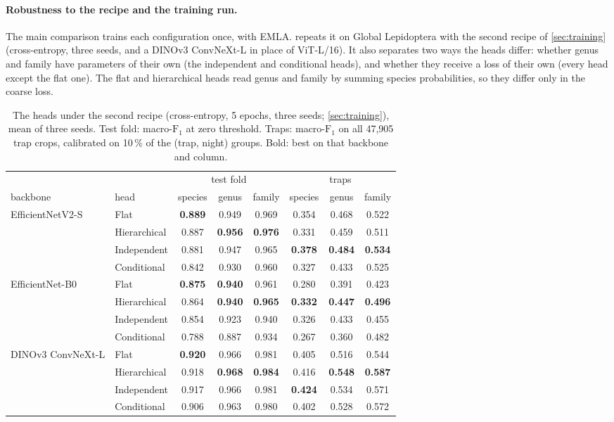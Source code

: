 \paragraph{Robustness to the recipe and the training run.}
The main comparison trains each configuration once, with EMLA.
 repeats it on Global Lepidoptera with the second recipe of \cref{sec:training} (cross-entropy, three seeds, and a DINOv3 ConvNeXt-L in place of ViT-L/16).
It also separates two ways the heads differ: whether genus and family have parameters of their own (the independent and conditional heads), and whether they receive a loss of their own (every head except the flat one).
The flat and hierarchical heads read genus and family by summing species probabilities, so they differ only in the coarse loss.

\begin{table}[htb]
    \centering
    \caption{The heads under the second recipe (cross-entropy, 5 epochs, three seeds; \cref{sec:training}), mean of three seeds. Test fold: macro-$\text{F}_1$ at zero threshold. Traps: macro-$\text{F}_1$ on all 47,905 trap crops, calibrated on 10\,\% of the (trap, night) groups. Bold: best on that backbone and column.}
    \label{tab:heads_ranks}
    \begin{tabular}{llcccccc}
        \toprule
        & & \multicolumn{3}{c}{test fold} & \multicolumn{3}{c}{traps} \\
        backbone & head & species & genus & family & species & genus & family \\
        \midrule
        EfficientNetV2-S & Flat & \textbf{0.889} & 0.949 & 0.969 & 0.354 & 0.468 & 0.522 \\
        & Hierarchical & 0.887 & \textbf{0.956} & \textbf{0.976} & 0.331 & 0.459 & 0.511 \\
        & Independent & 0.881 & 0.947 & 0.965 & \textbf{0.378} & \textbf{0.484} & \textbf{0.534} \\
        & Conditional & 0.842 & 0.930 & 0.960 & 0.327 & 0.433 & 0.525 \\
        \midrule
        EfficientNet-B0 & Flat & \textbf{0.875} & \textbf{0.940} & 0.961 & 0.280 & 0.391 & 0.423 \\
        & Hierarchical & 0.864 & \textbf{0.940} & \textbf{0.965} & \textbf{0.332} & \textbf{0.447} & \textbf{0.496} \\
        & Independent & 0.854 & 0.923 & 0.940 & 0.326 & 0.433 & 0.455 \\
        & Conditional & 0.788 & 0.887 & 0.934 & 0.267 & 0.360 & 0.482 \\
        \midrule
        DINOv3 ConvNeXt-L & Flat & \textbf{0.920} & 0.966 & 0.981 & 0.405 & 0.516 & 0.544 \\
        & Hierarchical & 0.918 & \textbf{0.968} & \textbf{0.984} & 0.416 & \textbf{0.548} & \textbf{0.587} \\
        & Independent & 0.917 & 0.966 & 0.981 & \textbf{0.424} & 0.534 & 0.571 \\
        & Conditional & 0.906 & 0.963 & 0.980 & 0.402 & 0.528 & 0.572 \\
        \bottomrule
    \end{tabular}
\end{table}

